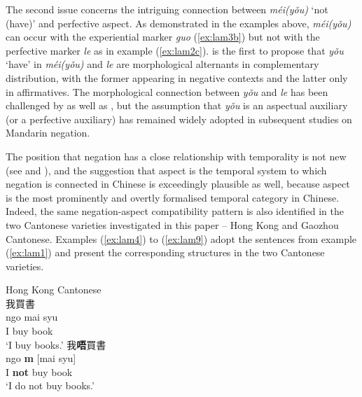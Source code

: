 \documentclass[output=paper]{langscibook}
\begin{document}
The second issue concerns the intriguing connection between \textit{méi(yǒu)} `not (have)' and perfective aspect. As demonstrated in the examples above, \textit{méi(yǒu)} can occur with the experiential marker \textit{guo} (\ref{ex:lam3b}) but not with the perfective marker \textit{le} as in example (\ref{ex:lam2c}). \cite{Wang1965} is the first to propose that \textit{yǒu} `have' in \textit{méi(yǒu)} and \textit{le} are morphological alternants in complementary distribution, with the former appearing in negative contexts and the latter only in affirmatives. The morphological connection between \textit{yǒu} and \textit{le} has been challenged by \citet[434--438]{LiThompson1981} as well as \cite{Li2007}, but the assumption that \textit{yǒu} is an aspectual auxiliary (or a perfective auxiliary) has remained widely adopted in subsequent studies on Mandarin negation.

The position that negation has a close relationship with temporality is not new (see \citealt{Zanuttini2001} and \citealt{Miestamo2005}), and the suggestion that aspect is the temporal system to which negation is connected in Chinese is exceedingly plausible as well, because aspect is the most prominently and overtly formalised temporal category in Chinese. Indeed, the same negation-aspect compatibility pattern is also identified in the two Cantonese varieties investigated in this paper – Hong Kong and Gaozhou Cantonese. Examples (\ref{ex:lam4}) to (\ref{ex:lam9}) adopt the sentences from example (\ref{ex:lam1}) and present the corresponding structures in the two Cantonese varieties.

\ea Hong Kong Cantonese \label{ex:lam4}\\
  \ea 我買書 \label{ex:lam4a}\\
    \gll ngo	mai	syu\\
	I buy book\\
	\glt `I buy books.'
  \ex 我\textbf{唔}買書 \label{ex:lam4b}\\
    \gll ngo	 \textbf{m} [mai syu]\\ 
	I \textbf{not} buy book\\
	\glt `I do not buy books.'
\z \z
\end{document}
